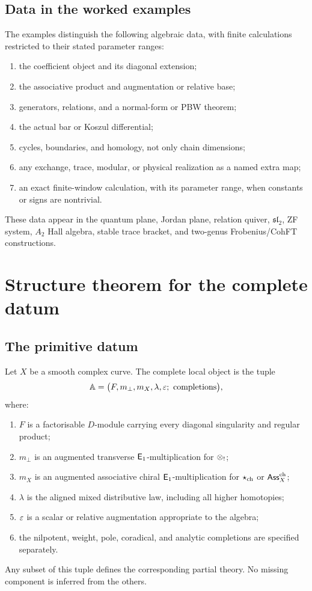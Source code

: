 \section{Data in the worked examples}
The examples distinguish the following algebraic data, with finite calculations restricted to their stated parameter ranges:
\begin{enumerate}
\item the coefficient object and its diagonal extension;
\item the associative product and augmentation or relative base;
\item generators, relations, and a normal-form or PBW theorem;
\item the actual bar or Koszul differential;
\item cycles, boundaries, and homology, not only chain dimensions;
\item any exchange, trace, modular, or physical realization as a named extra map;
\item an exact finite-window calculation, with its parameter range, when constants or signs are nontrivial.
\end{enumerate}
These data appear in the quantum plane, Jordan plane, relation quiver, \(\mathfrak{sl}_2\), ZF system, \(A_2\) Hall algebra, stable trace bracket, and two-genus Frobenius/CohFT constructions.

\chapter{Structure theorem for the complete datum}\label{chap:structure}

\section{The primitive datum}
Let \(X\) be a smooth complex curve.  The complete local object is the tuple
\[
 \mathbb A=
 \bigl(F,m_\perp,m_X,\lambda,\varepsilon;\ \text{completions}\bigr),
\]
where:
\begin{enumerate}
\item \(F\) is a factorisable \(D\)-module carrying every diagonal singularity and regular product;
\item \(m_\perp\) is an augmented transverse \(\mathsf E_1\)-multiplication for \(\mathbin{\otimes_{!}}\);
\item \(m_X\) is an augmented associative chiral \(\mathsf E_1\)-multiplication for \(\mathbin{\star_{\mathrm{ch}}}\) or \(\mathsf{Ass}^{\mathrm{ch}}_X\);
\item \(\lambda\) is the aligned mixed distributive law, including all higher homotopies;
\item \(\varepsilon\) is a scalar or relative augmentation appropriate to the algebra;
\item the nilpotent, weight, pole, coradical, and analytic completions are specified separately.
\end{enumerate}
Any subset of this tuple defines the corresponding partial theory.  No missing component is inferred from the others.


